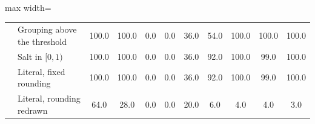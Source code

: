 \begin{table}
\begin{adjustbox}{max width=\textheight}
\begin{tabular}{llccccccccc}
 & Grouping above the threshold & 100.0 & 100.0 & 0.0 & 0.0 & 36.0 & 54.0 & 100.0 & 100.0 & 100.0 \\
 & Salt in $[0,1)$ & 100.0 & 100.0 & 0.0 & 0.0 & 36.0 & 92.0 & 100.0 & 99.0 & 100.0 \\
 & Literal, fixed rounding & 100.0 & 100.0 & 0.0 & 0.0 & 36.0 & 92.0 & 100.0 & 99.0 & 100.0 \\
 & Literal, rounding redrawn & 64.0 & 28.0 & 0.0 & 0.0 & 20.0 & 6.0 & 4.0 & 4.0 & 3.0 \\
\bottomrule
\end{tabular}
\end{adjustbox}
\end{table}
